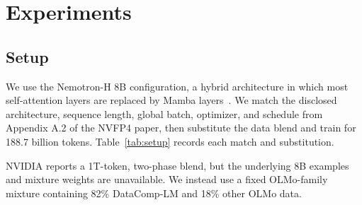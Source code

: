 \documentclass[11pt]{article}
\newcommand{\nv}{NVFP4}
\begin{document}
\section{Experiments}

\subsection{Setup}

We use the Nemotron-H 8B configuration, a hybrid architecture in which most
self-attention layers are replaced by Mamba layers~\citep{nvidia2025nemotronh}.
We match the disclosed architecture, sequence length, global batch, optimizer,
and schedule from Appendix A.2 of the \nv{} paper, then substitute the data
blend and train for 188.7 billion tokens.  Table~\ref{tab:setup} records each
match and substitution.

NVIDIA reports a 1T-token, two-phase blend, but the underlying 8B examples and
mixture weights are unavailable.  We instead use a fixed OLMo-family mixture
containing 82\% DataComp-LM and 18\% other OLMo data.
\end{document}
